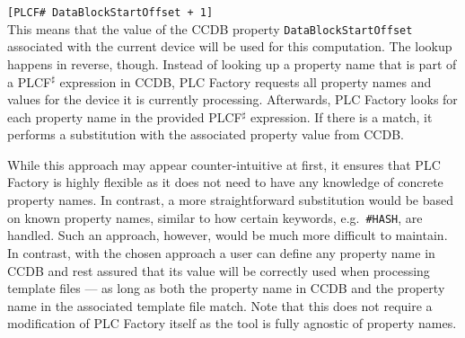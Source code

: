 \documentclass[a4paper,
              ]{jacow}
\begin{document}
\texttt{[PLCF\# DataBlockStartOffset + 1]} \\

This means that the value of the CCDB property \texttt{DataBlockStartOffset} associated with the current device will be used for this computation. The lookup happens in reverse, though. Instead of looking up a property name that is part of a PLCF$^\sharp$ expression in CCDB, PLC Factory requests all property names and values for the device it is currently processing. Afterwards, PLC Factory looks for each property name in the provided PLCF$^\sharp$ expression. If there is a match, it performs a substitution with the associated property value from CCDB.

While this approach may appear counter-intuitive at first, it ensures that PLC Factory is highly flexible as it does not need to have any knowledge of concrete property names. In contrast, a more straightforward substitution would be based on known property names, similar to how certain keywords, e.g.\ \texttt{\#HASH}, are handled. Such an approach, however, would be much more difficult to maintain. In contrast, with the chosen approach a user can define any property name in CCDB and rest assured that its value will be correctly used when processing template files --- as long as both the property name in CCDB and the property name in the associated template file match. Note that this does not require a modification of PLC Factory itself as the tool is fully agnostic of property names.

%
%    
%    
%    
\end{document}
